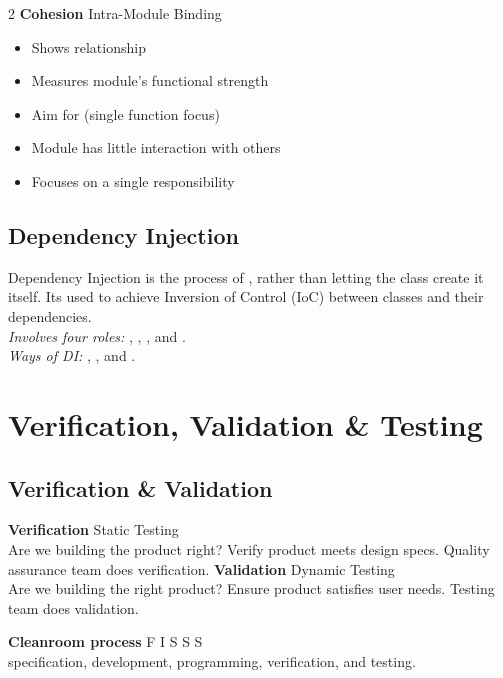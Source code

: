 \begin{multicols}{2}
   \textbf{Cohesion} \gray{|} Intra-Module Binding
   \vspace{-0.5\baselineskip}
   \begin{itemize}[parsep=0.15em]
       \item Shows relationship 
       \item Measures module's functional strength
       \item Aim for  (single function focus)
       \item Module has little interaction with others
       \item Focuses on a single responsibility
\end{itemize}

\subsection*{Dependency Injection}
Dependency Injection is the process of , rather than letting the class create it itself. Its used to achieve Inversion of Control (IoC) between classes and their dependencies.\\
\textit{Involves four roles:} , , , and .\\
\textit{Ways of DI:} , , and .


\section*{Verification, Validation \& Testing}

\subsection*{Verification \& Validation}
\textbf{Verification} \gray{|} Static Testing\\[0.2em]
Are we building the product right?  Verify product meets design specs.  Quality assurance team does verification.
\textbf{Validation} \gray{|} Dynamic Testing\\[0.2em]
Are we building the right product?  Ensure product satisfies user needs.  Testing team does validation.

\textbf{Cleanroom process} \gray{|} F I S S S\\[0.2em]
 specification,  development,  programming,  verification, and  testing.


\end{multicols}
